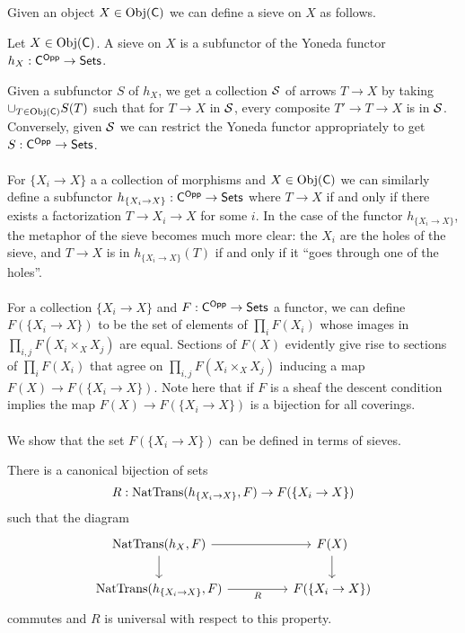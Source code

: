 Given an object $X\in\mathrm{Obj}(\mathsf{C})$ we can define a sieve on $X$ as follows. 
\begin{definition}[Sieve]
    Let $X\in\mathrm{Obj}(\mathsf{C})$. A sieve on $X$ is a subfunctor of the Yoneda functor $h_{X}:\mathsf{C}^{\mathsf{Opp}}\to\mathsf{Sets}$.
\end{definition}
Given a subfunctor $S$ of $h_{X}$, we get a collection $\mathcal{S}$ of arrows $T\to X$ by taking $\cup_{T\in\mathrm{Obj}(\mathsf{C})}S(T)$ such that for $T\to X$ in $\mathcal{S}$, every composite $T'\to T\to X$ is in $\mathcal{S}$. Conversely, given $\mathcal{S}$ we can restrict the Yoneda functor appropriately to get $S:\mathsf{C}^{\mathsf{Opp}}\to\mathsf{Sets}$. 
\\\\
For $\{X_{i}\to X\}$ a a collection of morphisms and $X\in\mathrm{Obj}(\mathsf{C})$ we can similarly define a subfunctor $h_{\{X_{i}\to X\}}:\mathsf{C}^{\mathsf{Opp}}\to\mathsf{Sets}$ where $T\to X$ if and only if there exists a factorization $T\to X_{i}\to X$ for some $i$. In the case of the functor $h_{\{X_{i}\to X\}}$, the metaphor of the sieve becomes much more clear: the $X_{i}$ are the holes of the sieve, and $T\to X$ is in $h_{\{X_{i}\to X\}}(T)$ if and only if it ``goes through one of the holes''. 
\\\\
For a collection $\{X_{i}\to X\}$ and $F:\mathsf{C}^{\mathsf{Opp}}\to\mathsf{Sets}$ a functor, we can define $F(\{X_{i}\to X\})$ to be the set of elements of $\prod_{i}F(X_{i})$ whose images in $\prod_{i,j}F(X_{i}\times_{X}X_{j})$ are equal. Sections of $F(X)$ evidently give rise to sections of $\prod_{i}F(X_{i})$ that agree on $\prod_{i,j}F(X_{i}\times_{X}X_{j})$ inducing a map $F(X)\to F(\{X_{i}\to X\})$. Note here that if $F$ is a sheaf the descent condition implies the map $F(X)\to F(\{X_{i}\to X\})$ is a bijection for all coverings. 
\\\\
We show that the set $F(\{X_{i}\to X\})$ can be defined in terms of sieves. 
\begin{proposition}\label{prop: sieve of cover}
    There is a canonical bijection of sets $$R:\mathrm{NatTrans}(h_{\{X_{i}\to X\}},F)\to F(\{X_{i}\to X\})$$ such that the diagram 
    $$%
    \begin{tikzcd}
        {\NatTrans(h_{X},F)} && {F(X)} \\
        {\NatTrans(h_{\{X_{i}\to X\}}, F)} && {F(\{X_{i}\to X\})}
        \arrow["R"', from=2-1, to=2-3]
        \arrow[from=1-3, to=2-3]
        \arrow[from=1-1, to=1-3]
        \arrow[from=1-1, to=2-1]
    \end{tikzcd}$$
    commutes and $R$ is universal with respect to this property. 
\end{proposition}
